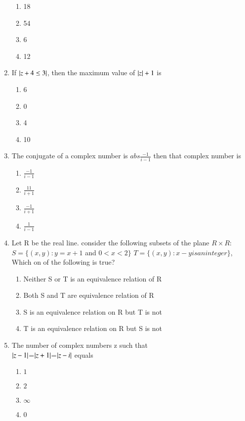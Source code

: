\begin{enumerate}[label=\arabic*.,ref=\thesubsection.\theenumi]
    \begin{enumerate}
    \item  18    
    \item  54    
    \item  6
    \item  12
    \end{enumerate}
    \item If $\left\vert z+4 \leq 3\right\vert$, then the maximum value of  $\left\vert z\right\vert+1 $ is 
    \begin{enumerate}
    \item  6    
    \item  0    
    \item  4
    \item 10
    \end{enumerate}
    \item The conjugate of a complex number is $abs{ \frac{-1}{i-1}}$ then that complex  number is 
    \begin{enumerate}
    \item  $\frac{-1}{i-1}$    
    \item  $\frac{11}{i+1}$    
    \item  $\frac{-1}{i+1}$
    \item  $\frac{1}{i-1}$
    \end{enumerate}
    \item  Let R be the real line. consider the following subsets of the plane $ R \times  R$:
    $S=\{(x,y):y=x+1$ and $0 < x < 2 \}$
    $T=\{(x,y):x-y is an integer\}$,
    Which on of the following is true?
    \begin{enumerate}
    \item  Neither S or T is an equivalence relation of R    
    \item  Both S and T are equivalence relation of R    
    \item  S is an equivalence relation on R but T is not
    \item  T is an equivalence relation on R but S is not
    \end{enumerate}
     \item The number of complex numbers z such that\\
    $\left\vert z-1\right\vert$=$\left\vert z+1\right\vert$=$\left\vert z-i\right\vert$ equals
    \begin{enumerate}
    \item  $1$    
    \item  $2$    
    \item  $\infty$
    \item  $0$
    \end{enumerate}

\end{enumerate}
